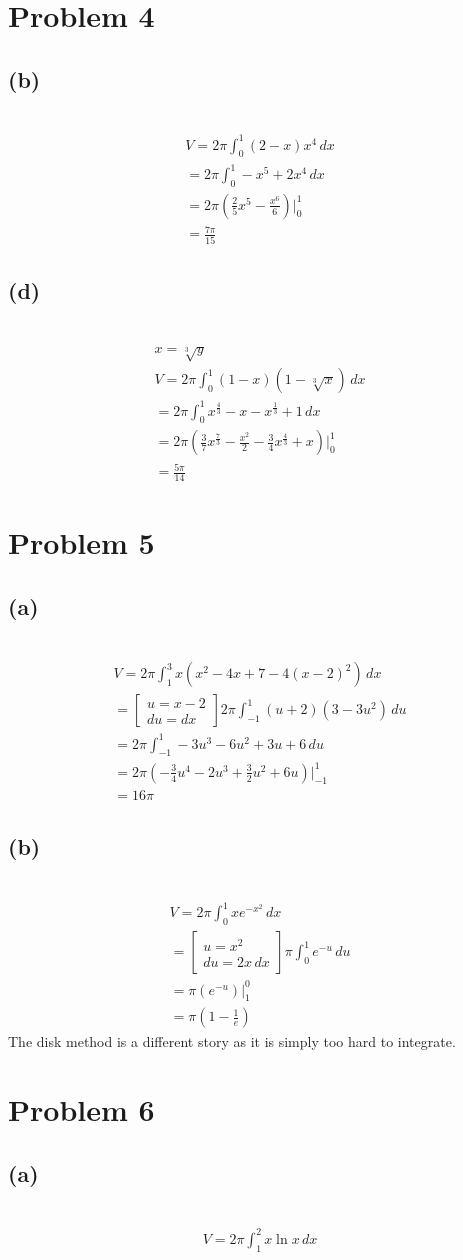 \documentclass[12pt]{article}
\newcommand*{\cbrt}[1]{\ensuremath{\sqrt[3]{#1}}}
\newcommand{\vem}{\vspace{0.5em}}
\newcommand{\problem}[1]{\section{Problem #1}}
\newcommand{\subproblem}[1]{\subsection{(#1)} \,}
\begin{document}
\problem{4}

\subproblem{b}
\begin{gather*}
    V=2\pi \int_0^1 (2-x) x^4\, dx\\
    =2\pi \int_0^1-x^5+2x^4\, dx\\
    =2\pi (\frac{2}{5}x^5-\frac{x^6}{6})\Big|_0^1\\
    = \boxed{\frac{7\pi}{15}}
\end{gather*}

\subproblem{d}
\begin{gather*}
    x=\cbrt y\\
    V= 2\pi\int_0^1 (1-x)(1-\cbrt x)\, dx\\
    =2\pi\int_0^1 x^\frac{4}{3}-x-x^\frac{1}{3}+1\, dx\\
    =2\pi (\frac{3}{7}x^\frac{7}{3}-\frac{x^2}{2}-\frac{3}{4}x^\frac{4}{3}+x)\Big|_0^1\\
    =\boxed{\frac{5\pi}{14}}
\end{gather*}

\problem{5}

\subproblem{a}
\begin{gather*}
    V=2\pi \int_1^3 x(x^2-4x+7-4(x-2)^2)\, dx\\
    = \begin{bmatrix}
        u = x-2\\
        du=dx
    \end{bmatrix} 2\pi \int_{-1}^1 (u+2)(3-3u^2)\, du\\
    = 2\pi \int_{-1}^1 -3u^3-6u^2+3u+6\, du\\
    = 2\pi (-\frac{3}{4}u^4-2u^3+\frac{3}{2}u^2+6u)\Big|_{-1}^1\\
    =\boxed{16\pi }
\end{gather*}

\subproblem{b}
\begin{gather*}
    V=2\pi \int_0^1 xe^{-x^2}\, dx\\
    = \begin{bmatrix}
        u=x^2\\
        du=2x\, dx
    \end{bmatrix} \pi \int_0^1 e^{-u}\, du\\
    = \pi (e^{-u})\Big|_1^0\\
    = \boxed{\pi (1-\frac{1}{e})}
\end{gather*}
The disk method is a different story as it is simply too hard to integrate.\vem

\problem{6}

\subproblem{a}
\begin{gather*}
    \boxed{V=2\pi \int_1^2 x\ln x \, dx}
\end{gather*}
\end{document}
